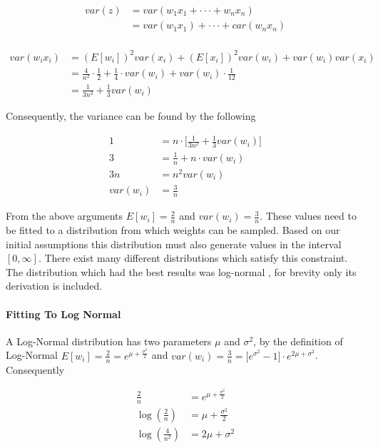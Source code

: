 \begin{align*}
var(z) &= var(w_1x_1 + \cdot \cdot \cdot + w_nx_n)\\
&= var(w_1x_1) + \cdot \cdot \cdot + car(w_nx_n)\\
\end{align*}

\begin{align*}
var(w_ix_i) &= (E[w_i])^2var(x_i) + (E[x_i])^2var(w_i) + var(w_i)var(x_i)\\
&= \frac{4}{n^2} \cdot \frac{1}{2} + \frac{1}{4} \cdot var(w_i) + var(w_i) \cdot \frac{1}{12}\\
&= \frac{1}{3 n^2} + \frac{1}{3}var(w_i)
\end{align*}

Consequently, the variance can be found by the following

\begin{align*}
1 &= n \cdot \big[\frac{1}{3 n^2} + \frac{1}{3}var(w_i)\big]\\
3 &= \frac{1}{n} + n \cdot var(w_i)\\
3n &= n^2 var(w_i)\\
var(w_i) &= \frac{3}{n}
\end{align*}

From the above arguments $E[w_i] = \frac{2}{n}$ and $var(w_i) = \frac{3}{n}$. These values need to be fitted to a distribution from which weights can be sampled. Based on our initial assumptions this distribution must also generate values in the interval $[0, \infty]$. There exist many different distributions which satisfy this constraint. The distribution which had the best results was log-normal \cite{balakrishnan2006continuous}, for brevity only its derivation is included.

\paragraph{Fitting To Log Normal}

A Log-Normal distribution has two parameters $\mu$ and $\sigma^2$, by the definition of Log-Normal $E[w_i] = \frac{2}{n} = e^{\mu + \frac{\sigma^2}{2}}$ and $var(w_i) = \frac{3}{n} = \big[e^{\sigma^2} - 1\big] \cdot e^{2\mu + \sigma^2}$. Consequently

\begin{align*}
\frac{2}{n} &= e^{\mu + \frac{\sigma^2}{2}}\\
\log(\frac{2}{n}) &= \mu + \frac{\sigma^2}{2}\\
\log(\frac{4}{n^2}) &= 2\mu + \sigma^2
\end{align*}

